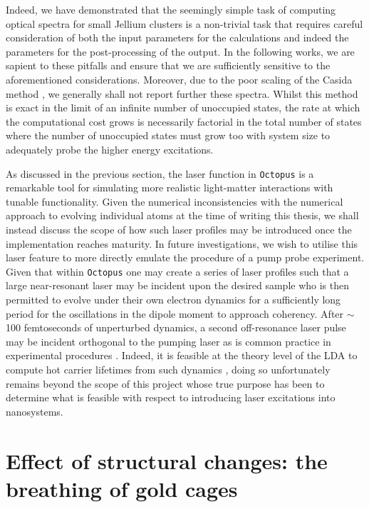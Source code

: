 Indeed, we have demonstrated that the seemingly simple task of computing optical spectra for small Jellium clusters is a non-trivial task that requires careful consideration of both the input parameters for the calculations and indeed the parameters for the post-processing of the output. In the following works, we are sapient to these pitfalls and ensure that we are sufficiently sensitive to the aforementioned considerations. Moreover, due to the poor scaling of the Casida method \cite{Casida}, we generally shall not report further these spectra. Whilst this method is exact in the limit of an infinite number of unoccupied states, the rate at which the computational cost grows is necessarily factorial in the total number of states where the number of unoccupied states must grow too with system size to adequately probe the higher energy excitations. 

As discussed in the previous section, the laser function in \texttt{Octopus} is a remarkable tool for simulating more realistic light-matter interactions with tunable functionality. Given the numerical inconsistencies with the numerical approach to evolving individual atoms at the time of writing this thesis, we shall instead discuss the scope of how such laser profiles may be introduced once the implementation reaches maturity. In future investigations, we wish to utilise this laser feature to more directly emulate the procedure of a pump probe experiment. Given that within \texttt{Octopus} one may create a series of laser profiles such that a large near-resonant laser may be incident upon the desired sample who is then permitted to evolve under their own electron dynamics for a sufficiently long period for the oscillations in the dipole moment to approach coherency. After $\sim$ 100 femtoseconds of unperturbed dynamics, a second off-resonance laser pulse may be incident orthogonal to the pumping laser as is common practice in experimental procedures \cite{https://doi.org/10.1002/lpor.202000346}. Indeed, it is feasible at the theory level of the LDA to compute hot carrier lifetimes from such dynamics \cite{https://doi.org/10.1002/lpor.202000346}, doing so unfortunately remains beyond the scope of this project whose true purpose has been to determine what is feasible with respect to introducing laser excitations into nanosystems. 

\section{Effect of structural changes: the breathing of gold cages}
\label{Pure}

